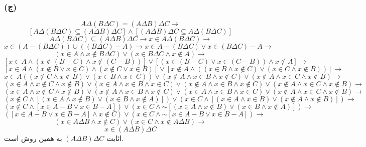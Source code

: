 \documentclass{article}
\newcommand{\tildevar}{\mathord{\sim}}
\begin{document}
            \subsubsection*{(ج)}
                \[A \Delta (B \Delta C) = (A \Delta B) \Delta C \rightarrow\]
                \[[A \Delta (B \Delta C) \subseteq (A \Delta B) \Delta C] \land [(A \Delta B) \Delta C \subseteq A \Delta (B \Delta C)]\]
                \[A \Delta (B \Delta C) \subseteq (A \Delta B) \Delta C \rightarrow x \in A \Delta (B \Delta C) \rightarrow\]
                \[x \in (A - (B \Delta C)) \cup ((B \Delta C) - A) \rightarrow x \in A - (B \Delta C) \lor x \in (B \Delta C) - A \rightarrow\]
                \[(x \in A \land x \not \in B \Delta C) \lor (x \in B \Delta C \land x \not \in A) \rightarrow\]
                \[[x \in A \land (x \not \in (B - C) \land x \not \in (C - B))] \lor [(x \in (B - C) \lor x \in (C - B)) \land x \not \in A] \rightarrow\]
                \[[x \in A \land (x \not \in B \lor x \in C) \land (x \not \in C \lor x \in B)] \lor [x \not \in A \land ((x \in B \land x \not \in C) \lor (x \in C \land x \not \in B))] \rightarrow\]
                \[x \in A ((x \not \in C \land x \not \in B) \lor (x \in B \land x \in C)) \lor (x \not \in A \land x \in B \land x \not \in C) \lor (x \not \in A \land x \in C \land x \not \in B) \rightarrow\]
                \[(x \in A \land x \not \in C \land x \not \in B) \lor (x \in A \land x \in B \land x \in C) \lor (x \not \in A \land x \in B \land x \not \in C) \lor (x \not \in A \land x \in C \land x \not \in B) \rightarrow\]
                \[(x \in A \land x \not \in C \land x \not \in B) \lor (x \not \in A \land x \in B \land x \not \in C) \lor (x \in A \land x \in B \land x \in C) \lor (x \not \in A \land x \in C \land x \not \in B) \rightarrow\]
                \[(x \not \in C \land [(x \in A \land x \not \in B) \lor (x \in B \land x \not \in A)]) \lor (x \in C \land [(x \in A \land x \in B) \lor (x \not \in A \land x \not \in B)]) \rightarrow\]
                \[(x \not \in C \land [x \in A - B \lor x \in B - A]) \lor (x \in C \land \tildevar [(x \in A \land x \not \in B) \lor (x \in B \land x \not \in A)]) \rightarrow\]
                \[([x \in A - B \lor x \in B - A] \land x \not \in C) \lor (x \in C \land \tildevar [x \in A - B \lor x \in B - A]) \rightarrow\]
                \[(x \in A \Delta B \land x \not \in C) \lor (x \in C \land x \not \in A \Delta B) \rightarrow\]
                \[x \in (A \Delta B) \Delta C\]
                اثابت $(A \Delta B) \Delta C$ به همین روش است.
            
\end{document}
